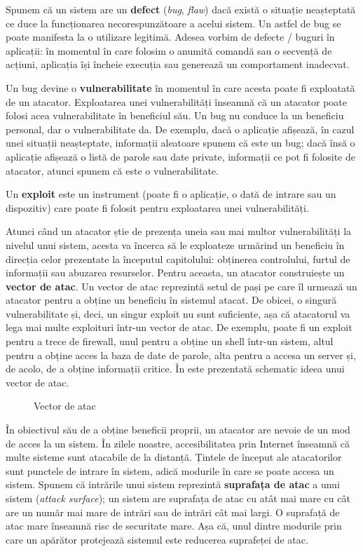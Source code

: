 Spunem că un sistem are un \textbf{defect} (\textit{bug}, \textit{flaw}) dacă există o situație neașteptată ce duce la funcționarea necorespunzătoare a acelui sistem. Un astfel de bug se poate manifesta la o utilizare legitimă. Adesea vorbim de defecte / buguri în aplicații: în momentul în care folosim o anumită comandă sau o secvență de acțiuni, aplicația își încheie execuția sau generează un comportament inadecvat.

Un bug devine o \textbf{vulnerabilitate} în momentul în care acesta poate fi exploatată de un atacator. Exploatarea unei vulnerabilități înseamnă că un atacator poate folosi acea vulnerabilitate în beneficiul său. Un bug nu conduce la un beneficiu personal, dar o vulnerabilitate da. De exemplu, dacă o aplicație afișează, în cazul unei situații neașteptate, informații aleatoare spunem că este un bug; dacă însă o aplicație afișează o listă de parole sau date private, informații ce pot fi folosite de atacator, atunci spunem că este o vulnerabilitate.

Un \textbf{exploit} este un instrument (poate fi o aplicație, o dată de intrare sau un dispozitiv) care poate fi folosit pentru exploatarea unei vulnerabilități.

Atunci când un atacator știe de prezența uneia sau mai multor vulnerabilități la nivelul unui sistem, acesta va încerca să le exploateze urmărind un beneficiu în direcția celor prezentate la începutul capitolului: obținerea controlului, furtul de informații sau abuzarea resurselor. Pentru aceasta, un atacator construiește un \textbf{vector de atac}. Un vector de atac reprezintă setul de pași pe care îl urmează un atacator pentru a obține un beneficiu în sistemul atacat. De obicei, o singură vulnerabilitate și, deci, un singur exploit nu sunt suficiente, așa că atacatorul va lega mai multe exploituri într-un vector de atac. De exemplu, poate fi un exploit pentru a trece de firewall, unul pentru a obține un shell într-un sistem, altul pentru a obține acces la baza de date de parole, alta pentru a accesa un server și, de acolo, de a obține informații critice. În  este prezentată schematic ideea unui vector de atac.

\begin{figure}[htbp]
  \centering
  \def\svgwidth{\columnwidth}
  
  \caption{Vector de atac}
  \label{fig:sec:attack-vector}
\end{figure}

În obiectivul său de a obține beneficii proprii, un atacator are nevoie de un mod de acces la un sistem. În zilele noastre, accesibilitatea prin Internet înseamnă că multe sisteme sunt atacabile de la distanță. Țintele de început ale atacatorilor sunt punctele de intrare în sistem, adică modurile în care se poate accesa un sistem. Spunem că intrările unui sistem reprezintă \textbf{suprafața de atac} a unui sistem (\textit{attack surface}); un sistem are suprafața de atac cu atât mai mare cu cât are un număr mai mare de intrări sau de intrări cât mai largi. O suprafață de atac mare înseamnă risc de securitate mare. Așa că, unul dintre modurile prin care un apărător protejează sistemul este reducerea suprafeței de atac.

